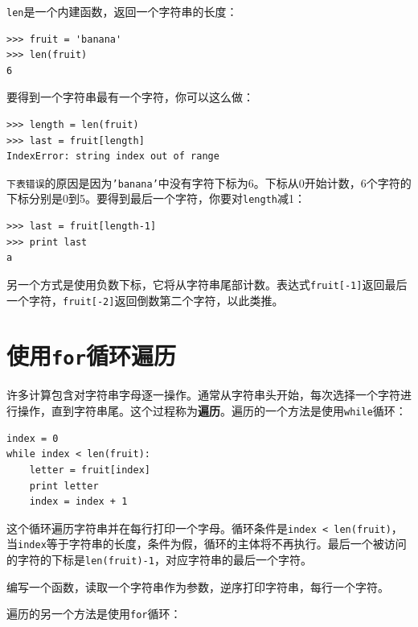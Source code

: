 {\tt len}是一个内建函数，返回一个字符串的长度：

\beforeverb
\begin{verbatim}
>>> fruit = 'banana'
>>> len(fruit)
6
\end{verbatim}
\afterverb
%
要得到一个字符串最有一个字符，你可以这么做：


\beforeverb
\begin{verbatim}
>>> length = len(fruit)
>>> last = fruit[length]
IndexError: string index out of range
\end{verbatim}
\afterverb
%
{\tt 下表错误}的原因是因为{\tt 'banana'}中没有字符下标为6。下标从0开始计数，6个字符的下标分别是0到5。要得到最后一个字符，你要对{\tt length}减1：

\beforeverb
\begin{verbatim}
>>> last = fruit[length-1]
>>> print last
a
\end{verbatim}
\afterverb
%
另一个方式是使用负数下标，它将从字符串尾部计数。表达式{\tt fruit[-1]}返回最后一个字符，{\tt fruit[-2]}返回倒数第二个字符，以此类推。



\section{使用{\tt for}循环遍历}
\label{for}


许多计算包含对字符串字母逐一操作。通常从字符串头开始，每次选择一个字符进行操作，直到字符串尾。这个过程称为{\bf 遍历}。遍历的一个方法是使用{\tt while}循环：

\beforeverb
\begin{verbatim}
index = 0
while index < len(fruit):
    letter = fruit[index]
    print letter
    index = index + 1
\end{verbatim}
\afterverb
%
这个循环遍历字符串并在每行打印一个字母。循环条件是{\tt index < len(fruit)}，当{\tt index}等于字符串的长度，条件为假，循环的主体将不再执行。最后一个被访问的字符的下标是{\tt len(fruit)-1}，对应字符串的最后一个字符。

\begin{ex}
编写一个函数，读取一个字符串作为参数，逆序打印字符串，每行一个字符。
\end{ex}

遍历的另一个方法是使用{\tt for}循环：

